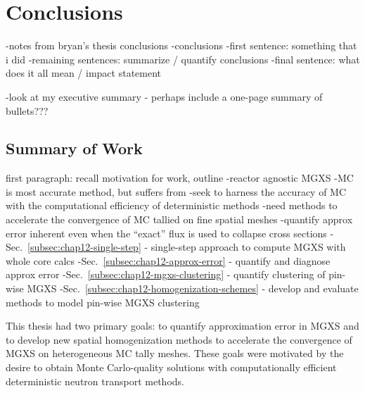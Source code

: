 \chapter{Conclusions}
\label{chap:conclusions-future-work}

-notes from bryan's thesis conclusions
  -conclusions
    -first sentence: something that i did
    -remaining sentences: summarize / quantify conclusions
    -final sentence: what does it all mean / impact statement


-look at my executive summary - perhaps include a one-page summary of bullets???

\section{Summary of Work}
\label{sec:chap12-conclusions}

first paragraph: recall motivation for work, outline
-reactor agnostic MGXS
-MC is most accurate method, but suffers from 
-seek to harness the accuracy of \ac{MC} with the computational efficiency of deterministic methods
-need methods to accelerate the convergence of \ac{MC} tallied on fine spatial meshes
-quantify approx error inherent even when the ``exact'' flux is used to collapse cross sections
-Sec.~\ref{subsec:chap12-single-step} - single-step approach to compute \ac{MGXS} with whole core calcs
-Sec.~\ref{subsec:chap12-approx-error} - quantify and diagnose approx error
-Sec.~\ref{subsec:chap12-mgxs-clustering} - quantify clustering of pin-wise MGXS
-Sec.~\ref{subsec:chap12-homogenization-schemes} - develop and evaluate methods to model pin-wise MGXS clustering

This thesis had two primary goals: to quantify approximation error in MGXS and to develop new spatial homogenization methods to accelerate the convergence of MGXS on heterogeneous MC tally meshes. These goals were motivated by the desire to obtain Monte Carlo-quality solutions with computationally efficient deterministic neutron transport methods.

